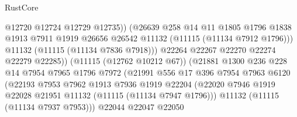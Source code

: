 \begin{lexlean}{RustCore}
\begin{coremodule}
                                      @12720
                                      @12724
                                      @12729
                                      @12735))
                                  (@26639
                                    @258
                                    @14
                                    @11
                                    @1805
                                    @1796
                                    @1838
                                    @1913
                                    @7911
                                    @1919
                                    @26656
                                    @26542
                                    @11132
                                    (@11115 (@11134 @7912 @1796)))
                                  @11132
                                  (@11115 (@11134 @7836 @7918)))
                                @22264
                                @22267
                                @22270
                                @22274
                                @22279
                                @22285))
                            (@11115 (@12762 @10212 @67))
                            (@21881
                              @1300
                              @236
                              @228
                              @14
                              @7954
                              @7965
                              @1796
                              @7972
                              (@21991
                                @556
                                @17
                                @396
                                @7954
                                @7963
                                @6120
                                (@22193
                                  @7953
                                  @7962
                                  @1913
                                  @7936
                                  @1919
                                  @22204
                                  (@22020
                                    @7946
                                    @1919
                                    @22028
                                    @21951
                                    @11132
                                    (@11115 (@11134 @7947 @1796)))
                                  @11132
                                  (@11115 (@11134 @7937 @7953)))
                                @22044
                                @22047
                                @22050

\end{coremodule}
\end{lexlean}
